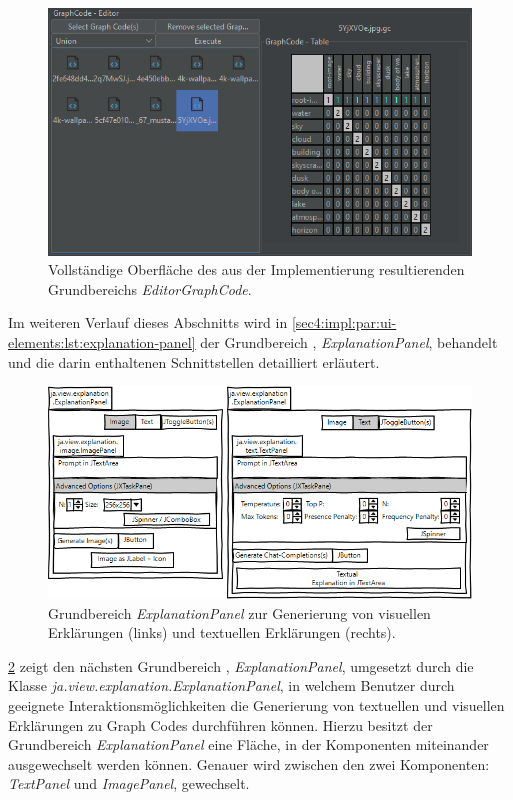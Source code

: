 \begin{figure}[!ht]
  \includegraphics[width=\textwidth]{chapter/chapter_4/wireframe-impl-ui-left-complete}
  \caption{Vollständige Oberfläche des aus der Implementierung resultierenden Grundbereichs \textit{EditorGraphCode}.}
  \label{sec4:impl:par:ui-elements:fig:wireframe-ui-left-complete}
\end{figure}

Im weiteren Verlauf dieses Abschnitts wird in \cref{sec4:impl:par:ui-elements:lst:explanation-panel} der Grundbereich , \textit{ExplanationPanel}, behandelt und die darin enthaltenen Schnittstellen detailliert erläutert.

\clearpage

\begin{figure}[!ht]
  \includegraphics[width=\textwidth]{chapter/chapter_4/wireframe-impl-right}
  \caption{Grundbereich \textit{ExplanationPanel} zur Generierung von visuellen Erklärungen (links) und textuellen Erklärungen (rechts).}
  \label{sec4:impl:subsubsec:ui:fig:wireframe-explanation-panel}
\end{figure}

\cref{sec4:impl:subsubsec:ui:fig:wireframe-explanation-panel} zeigt den nächsten Grundbereich , \textit{ExplanationPanel}, umgesetzt durch die Klasse \textit{ja.view.explanation.ExplanationPanel}, in welchem Benutzer durch geeignete Interaktionsmöglichkeiten die Generierung von textuellen und visuellen Erklärungen zu Graph Codes durchführen können.
Hierzu besitzt der Grundbereich \textit{ExplanationPanel} eine Fläche, in der Komponenten miteinander ausgewechselt werden können.
Genauer wird zwischen den zwei Komponenten: \textit{TextPanel} und \textit{ImagePanel}, gewechselt.

